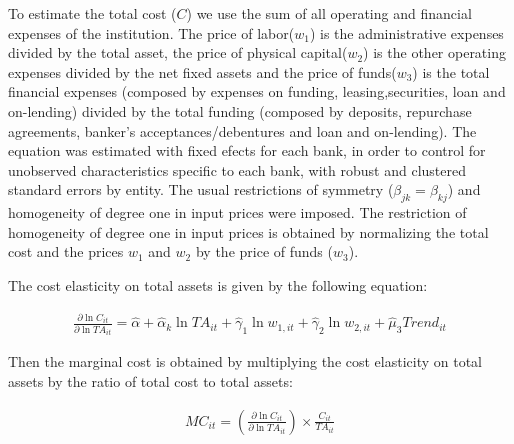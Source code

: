 To estimate the total cost ($C$) we use the sum of all operating and financial expenses of the institution. The price of labor($w_1$) is the administrative expenses divided by the total asset, the price of physical capital($w_2$) is the other operating expenses divided by the net fixed assets and the price of funds($w_3$) is the total financial expenses (composed by expenses on funding, leasing,securities, loan and on-lending) divided by the total funding (composed by deposits, repurchase agreements, banker's acceptances/debentures and loan and on-lending). The equation was estimated with fixed efects for each bank, in order to control for unobserved characteristics specific to each bank, with robust and clustered standard errors by entity. The usual restrictions of symmetry ($\beta_{jk} = \beta_{kj}$) and homogeneity of degree one in input prices were imposed. The restriction of homogeneity of degree one in input prices is obtained by normalizing the total cost and the prices $w_1$ and $w_2$ by the price of funds ($w_3$).

The cost elasticity on total assets is given by the following equation:

\begin{equation}
    \begin{aligned}
        \frac{\partial \ln C_{it}}{\partial \ln TA_{it}} = \hat{\alpha} + \hat{\alpha}_k \ln TA_{it} + \hat{\gamma}_1 \ln w_{1,it} + \hat{\gamma}_2 \ln w_{2,it} + \hat{\mu}_3 \textit{Trend}_{it}
    \end{aligned}
\end{equation}

Then the marginal cost is obtained by multiplying the cost elasticity on total assets by the ratio of total cost to total assets:

\begin{equation}
    \begin{aligned}
        MC_{it} = \left( \frac{\partial \ln C_{it}}{\partial \ln TA_{it}} \right) \times \frac{C_{it}}{TA_{it}}
    \end{aligned}
\end{equation}




